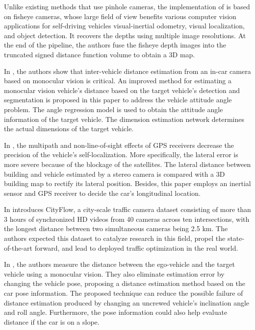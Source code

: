Unlike existing methods that use pinhole cameras, the implementation of \cite{Cui2019} is based on fisheye cameras, whose large field of view benefits various computer vision applications for self-driving vehicles visual-inertial odometry, visual localization, and object detection. It recovers the depths using multiple image resolutions. At the end of the pipeline, the authors fuse the fisheye depth images into the truncated signed distance function volume to obtain a 3D map.

In \cite{Huang2019}, the authors show that inter-vehicle distance estimation from an in-car camera based on monocular vision is critical.  An improved method for estimating a monocular vision vehicle's distance based on the target vehicle's detection and segmentation is proposed in this paper to address the vehicle attitude angle problem. The angle regression model is used to obtain the attitude angle information of the target vehicle. The dimension estimation network determines the actual dimensions of the target vehicle.

In \cite{Bao2016}, the multipath and non-line-of-sight effects of GPS receivers decrease the precision of the vehicle's self-localization. More specifically, the lateral error is more severe because of the blockage of the satellites. The lateral distance between building and vehicle estimated by a stereo camera is compared with a 3D building map to rectify its lateral position. Besides, this paper employs an inertial sensor and GPS receiver to decide the car's longitudinal location.

In \cite{Tang2019} introduces CityFlow, a city-scale traffic camera dataset consisting of more than 3 hours of synchronized HD videos from 40 cameras across ten intersections, with the longest distance between two simultaneous cameras being 2.5 km. The authors expected this dataset to catalyze research in this field, propel the state-of-the-art forward, and lead to deployed traffic optimization in the real world.

In \cite{Qi2019}, the authors measure the distance between the ego-vehicle and the target vehicle using a monocular vision. They also eliminate estimation error by changing the vehicle pose, proposing a distance estimation method based on the car pose information. The proposed technique can reduce the possible failure of distance estimation produced by changing an uncrewed vehicle's inclination angle and roll angle. Furthermore, the pose information could also help evaluate distance if the car is on a slope.

